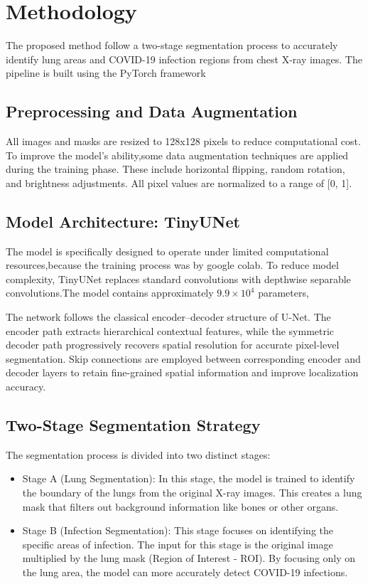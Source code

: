 \documentclass{IEEEtran}
\begin{document}
\section{Methodology}
The proposed method follow a two-stage segmentation process to accurately identify lung areas and COVID-19 infection regions from chest X-ray images. The pipeline is built using the PyTorch framework
\subsection{Preprocessing and Data Augmentation}
All images and masks are resized to 128x128 pixels to reduce computational cost. To improve the model's ability,some data augmentation techniques are applied during the training phase. These include horizontal flipping, random rotation, and brightness adjustments. All pixel values are normalized to a range of [0, 1].

\subsection{Model Architecture: TinyUNet}
The model is specifically designed to operate under limited computational resources,because the training process was by google colab.
To reduce model complexity, TinyUNet replaces standard convolutions with depthwise separable convolutions.The model contains approximately $9.9\times10^{4}$ parameters,

The network follows the classical encoder--decoder structure of U-Net. The encoder path extracts hierarchical contextual features, while the symmetric decoder path progressively recovers spatial resolution for accurate pixel-level segmentation. Skip connections are employed between corresponding encoder and decoder layers to retain fine-grained spatial information and improve localization accuracy.


\subsection{Two-Stage Segmentation Strategy}
The segmentation process is divided into two distinct stages:

\begin{itemize}
    \item Stage A (Lung Segmentation): In this stage, the model is trained to identify the boundary of the lungs from the original X-ray images. This creates a lung mask that filters out background information like bones or other organs.
    \item Stage B (Infection Segmentation): This stage focuses on identifying the specific areas of infection. The input for this stage is the original image multiplied by the lung mask (Region of Interest - ROI). By focusing only on the lung area, the model can more accurately detect COVID-19 infections.
\end{itemize}
\end{document}
